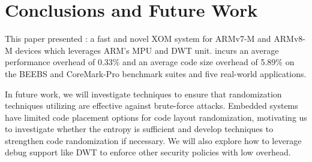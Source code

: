 \section{Conclusions and Future Work}
\label{sec:conc}

This paper presented {\System}: a fast and novel XOM system for
ARMv7-M and ARMv8-M devices which leverages ARM's MPU and
DWT unit.
{\System} incurs an average performance overhead of 0.33\% and an average
code size
overhead of 5.89\% on the BEEBS and CoreMark-Pro benchmark suites and
five real-world applications.

In future work, we will investigate techniques to ensure that
randomization techniques utilizing {\System} are effective
against brute-force attacks.  Embedded systems have limited code placement
options for code layout randomization, motivating us to
investigate whether the entropy is sufficient and develop
techniques to strengthen code randomization if necessary.
We will also explore how to leverage debug support like DWT to enforce
other security policies with low overhead.
